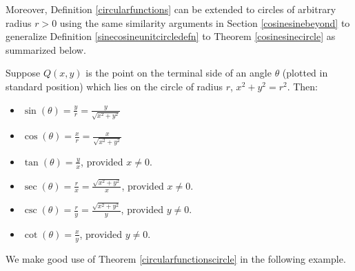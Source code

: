 \documentclass{ximera}
\begin{document}
Moreover,  Definition \ref{circularfunctions}  can be extended to circles of arbitrary radius $r>0$ using the same similarity arguments in Section \ref{cosinesinebeyond} to generalize Definition \ref{sinecosineunitcircledefn} to Theorem \ref{cosinesinecircle} as summarized below.




\begin{theorem} \label{circularfunctionscircle} Suppose $Q(x,y)$ is the point on the terminal side of an angle $\theta$ (plotted in standard position) which lies on the circle of radius $r$,  $x^2+y^2 = r^2$. Then:

\begin{itemize}

\item  $\sin(\theta) = \frac{y}{r} = \frac{y}{\sqrt{x^2+y^2}}$ 

\item $\cos(\theta)= \frac{x}{r}  = \frac{x}{\sqrt{x^2+y^2}}$ 

\item $\tan(\theta) = \frac{y}{x}$, provided $x \neq 0$. 

\item $\sec(\theta) = \frac{r}{x} = \frac{\sqrt{x^2+y^2}}{x}$, provided $x \neq 0$. 

\item $\csc(\theta) = \frac{r}{y} = \frac{\sqrt{x^2+y^2}}{y}$, provided $y \neq 0$. 

\item $\cot(\theta) = \frac{x}{y}$, provided $y \neq 0$. 

\end{itemize}

\end{theorem}




We make good use of Theorem \ref{circularfunctionscircle}  in the following example.
\end{document}
